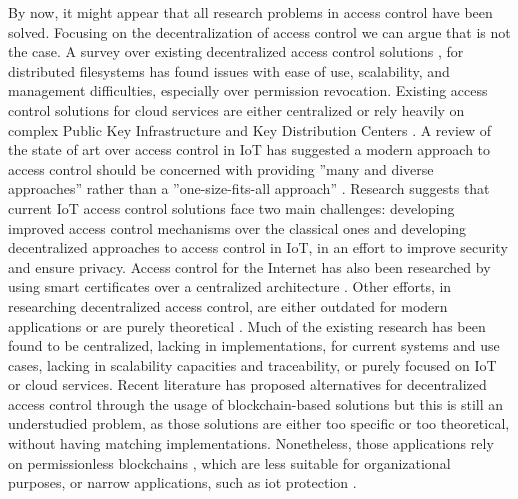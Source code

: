 By now, it might appear that all research problems in access control have been solved. Focusing on the decentralization of access control we can argue that is not the case. A survey over existing decentralized access control solutions \cite{miltchev_decentralized_2008}, for distributed filesystems has found issues with ease of use, scalability, and management difficulties, especially over permission revocation. Existing access control solutions for cloud services are either centralized \cite{calero_toward_2010, ruj_dacc:_2011, yu_achieving_2010} or rely heavily on complex Public Key Infrastructure and Key Distribution Centers \cite{ruj_privacy_2012, ruj_decentralized_2014,bauer_distributed_2005}. A review of the state of art over access control in IoT \cite{ouaddah_access_2017} has suggested a modern approach to access control should be concerned with providing ”many and diverse approaches” \cite[242]{ouaddah_access_2017} rather than a ”one-size-fits-all approach” \cite[242]{ouaddah_access_2017}. Research \cite{ouaddah_access_2017} suggests that current IoT access control solutions face two main challenges: developing improved access control mechanisms over the classical ones and developing decentralized approaches to access control in IoT, in an effort to improve security and ensure privacy. Access control for the Internet has also been researched by using smart certificates over a centralized architecture \cite{park_smart_1999}. Other efforts, in researching decentralized access control, are either outdated for modern applications \cite{satyanarayanan_integrating_1989, karger_non-discretionary_1977} or are purely theoretical \cite{thomas_towards_1993}. Much of the existing research has been found to be centralized, lacking in implementations, for current systems and use cases, lacking in scalability capacities and traceability, or purely focused on IoT or cloud services. Recent literature has proposed alternatives for decentralized access control through the usage of blockchain-based solutions but this is still an understudied problem, as those solutions are either too specific or too theoretical, without having matching implementations. Nonetheless, those applications rely on permissionless blockchains \cite{maesa_blockchain_2017}, which are less suitable for organizational purposes, or narrow applications, such as \gls{iot} protection \cite{ouaddah_fairaccess:_2017}.

